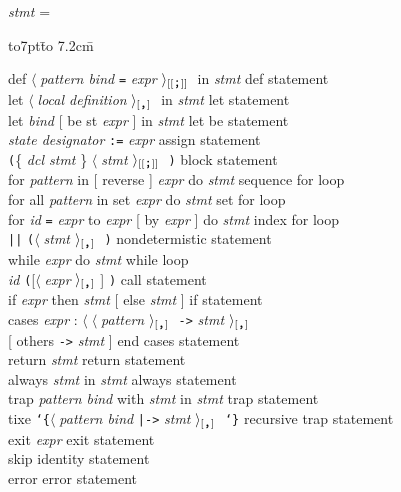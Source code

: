 \documentclass[a4paper]{jsarticle}
\newcommand{\K}[1]{{\sf #1}}
\newcommand{\id}[1]{{\it #1\/}}
\newcommand{\AL}{$\langle\;$}
\newcommand{\AR}[1]{$\rangle_{[\hbox{\tt#1}]}\;$}
\newcommand{\ARX}[1]{$\rangle_{[[\hbox{\tt#1}]]}\;$}
\newcommand{\lb}{{\tt\char`\{}}
\newcommand{\rb}{{\tt\char`\}}}
\newcommand{\lp}{{\tt(}}
\newcommand{\rp}{{\tt)}}
\newenvironment{tabbingone}[0]{
\begingroup
  \parskip=0pt
  \topsep=0pt
  \partopsep=0pt
  \begin{tabbing}
    \hbox to7pt{}\=%
    \hbox to 7.2cm{}\=%
    \kill
    \+ %
    \kill
}{
  \end{tabbing}
\endgroup}
\begin{document}
\id{stmt} =
\begin{tabbingone}

  \K{def} \AL \id{pattern bind} {\tt=} \id{expr} \ARX{;} \K{in} \id{stmt} \> def statement\\
  \K{let} \AL \id{local definition} \AR{,} \K{in} \id{stmt} \> let statement\\
  \K{let} \id{bind} [ \K{be st} \id{expr} ] \K{in} \id{stmt}\> let be statement\\
  \id{state designator} {\tt:=} \id{expr} \> assign statement\\
  \lp \{ \id{dcl stmt} \}   \AL \id{stmt} \ARX{;} \rp \> block statement\\
  \K{for} \id{pattern} \K{in} [ \K{reverse} ] \id{expr} \K{do} \id{stmt} \> sequence for loop\\
  \K{for} \K{all} \id{pattern} \K{in} \K{set} \id{expr} \K{do} \id{stmt}
  \> set for loop\\
  \K{for} \id{id} {\tt=} \id{expr} \K{to} \id{expr} [ \K{by} \id{expr} ] \K{do} \id{stmt} \> index for loop\\
  {\tt||} \lp \AL \id{stmt} \AR{,} \rp \> nondetermistic statement \\
  \K{while} \id{expr} \K{do} \id{stmt} \> while loop\\
    
  \id{id} \lp [\AL \id{expr} \AR{,}] \rp \> call statement\\
  \K{if} \id{expr} \K{then} \id{stmt} [ \K{else} \id{stmt} ] \> if statement\\
  \K{cases} \id{expr} : \AL \AL \id{pattern} \AR{,} {\tt ->} \id{stmt} \AR{,} \\
  \hspace*{2cm} [ \K{others} {\tt ->} \id{stmt} ] \K{end} \> cases statement\\
  \K{return} \id{stmt} \> return statement\\
  \K{always} \id{stmt} \K{in} \id{stmt} \> always statement \\
  \K{trap} \id{pattern bind} \K{with} \id{stmt} \K{in} \id{stmt} \> trap statement \\ 
  \K{tixe} \lb \AL \id{pattern bind} {\tt|->} \id{stmt} \AR{,} \rb \> recursive trap statement \\
  \K{exit} \id{expr} \> exit statement \\
  \K{skip} \> identity statement \\
  \K{error} \> error statement\\
\end{tabbingone}
\end{document}
